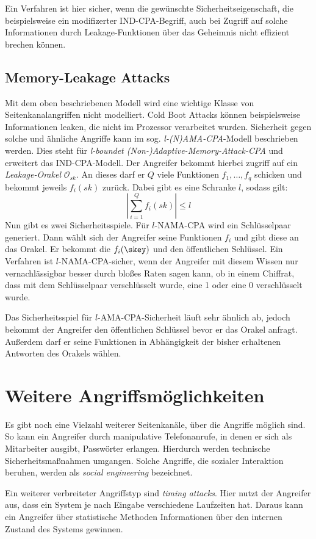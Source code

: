 Ein Verfahren ist hier sicher, wenn die gewünschte
Sicherheitseigenschaft, die beispielsweise ein modifizerter
IND-CPA-Begriff, auch bei Zugriff auf solche Informationen durch
Leakage-Funktionen über das Geheimnis nicht effizient brechen können. 
\subsection{Memory-Leakage Attacks}
Mit dem oben beschriebenen Modell wird eine wichtige Klasse von
Seitenkanalangriffen nicht modelliert. Cold Boot Attacks können
beispielsweise Informationen leaken, die nicht im Prozessor verarbeitet
wurden. Sicherheit gegen solche und ähnliche Angriffe kann im
sog. \emph{l-(N)AMA-CPA}-Modell beschrieben werden. Dies steht für
\emph{l-boundet (Non-)Adaptive-Memory-Attack-CPA} und erweitert das
IND-CPA-Modell. Der Angreifer bekommt hierbei zugriff auf ein
\emph{Leakage-Orakel} $\mathcal{O}_{sk}$. An dieses darf er $Q$ viele
Funktionen $f_1, \dots, f_q$ schicken und bekommt jeweils $f_i(sk)$
zurück. Dabei gibt es eine Schranke $l$, sodass gilt:
\[
|\sum_{i=1}^Q f_i(sk)|\leq l
\]
Nun gibt es zwei Sicherheitsspiele. Für $l$-NAMA-CPA wird ein
Schlüsselpaar generiert. Dann wählt sich der Angreifer seine Funktionen
$f_i$ und gibt diese an das Orakel. Er bekommt die $f_i(\skey)$ und den
öffentlichen Schlüssel. Ein Verfahren ist $l$-NAMA-CPA-sicher, wenn der
Angreifer mit diesem Wissen nur vernachlässigbar besser durch bloßes
Raten sagen kann, ob in einem Chiffrat, dass mit dem Schlüsselpaar
verschlüsselt wurde, eine 1 oder eine 0 verschlüsselt wurde.

Das Sicherheitsspiel für $l$-AMA-CPA-Sicherheit läuft sehr ähnlich ab,
jedoch bekommt der Angreifer den öffentlichen Schlüssel bevor er das
Orakel anfragt. Außerdem darf er seine Funktionen in Abhängigkeit der
bisher erhaltenen Antworten des Orakels wählen.


\section{Weitere Angriffsmöglichkeiten}
Es gibt noch eine Vielzahl weiterer Seitenkanäle, über die Angriffe
möglich sind. So kann ein Angreifer durch manipulative Telefonanrufe, in
denen er sich als Mitarbeiter ausgibt, Passwörter erlangen. Hierdurch
werden technische Sicherheitsmaßnahmen umgangen. Solche Angriffe, die
sozialer Interaktion beruhen, werden als \emph{social engineering}
bezeichnet.

Ein weiterer verbreiteter Angriffstyp sind \emph{timing attacks}. Hier
nutzt der Angreifer aus, dass ein System je nach Eingabe verschiedene
Laufzeiten hat. Daraus kann ein Angreifer über statistische Methoden
Informationen über den internen Zustand des Systems gewinnen.

